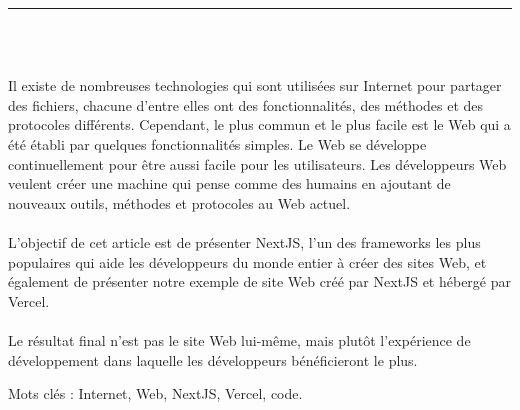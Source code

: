\documentclass[12pt]{report}
\newenvironment{changemargin}[2]{%
\begin{list}{}{%
\setlength{\topsep}{0pt}%
\setlength{\leftmargin}{#1}%
\setlength{\rightmargin}{#2}%
\setlength{\listparindent}{\parindent}%
\setlength{\itemindent}{\parindent}%
\setlength{\parsep}{\parskip}%
}%
\item[]}{\end{list}}
\begin{document}
\begin{center}
    {\color{Blue} \rule{3in}{1.4mm} }\\
    \vspace{0.1in}
    \scshape{\fontsize{34}{46}{\bfseries{\color{Blue}{Résumé}}}}
    \\
    \vspace{0.6in}
\end{center}
\begin{changemargin}{0.9cm}{0.9cm}
\hspace*{0.16in}
Il existe de nombreuses technologies qui sont utilisées sur Internet pour partager des fichiers, chacune d’entre elles ont des fonctionnalités, des méthodes et des protocoles différents. Cependant, le plus commun et le plus facile est le Web qui a été établi par quelques fonctionnalités simples. Le Web se développe continuellement pour être aussi facile pour les utilisateurs. Les développeurs Web veulent créer une machine qui pense comme des humains en ajoutant de nouveaux outils, méthodes et protocoles au Web actuel.
\\\\
\hspace*{0.16in}
L’objectif de cet article est de présenter NextJS, l’un des frameworks les plus populaires qui aide les développeurs du monde entier à créer des sites Web, et également de présenter notre exemple de site Web créé par NextJS et hébergé par Vercel.
\\\\
\hspace*{0.16in}
Le résultat final n’est pas le site Web lui-même, mais plutôt l’expérience de développement dans laquelle les développeurs bénéficieront le plus.\end{changemargin}

\vspace{1in}

\begin{changemargin}{0.9cm}{0.9cm}
Mots clés : Internet, Web, NextJS, Vercel, code.
\end{changemargin}

\newpage

\vspace*{0.2in}

\thispagestyle{empty}
\end{document}
